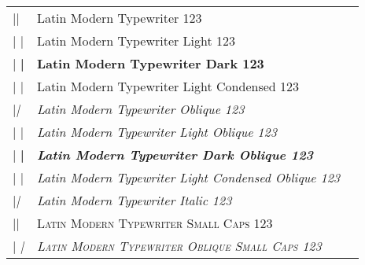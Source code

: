 \documentclass[a4paper]{article}
\makeatletter
\newenvironment{vrb}{\begin{tabular}{@{}p{5cm}ll@{}}}{\end{tabular}}
\makeatother
\begin{document}
\tmstyle
\begin{vrb}
|\ttfamily\tmstyle | & {Latin Modern Typewriter 123} \\
|  \lgweight | & {\lgweight Latin Modern Typewriter Light 123} \\
|  \bfseries | & {\bfseries Latin Modern Typewriter Dark 123} \\
|  \fontseries{lc}\selectfont | & {\fontseries{lc}\selectfont Latin Modern Typewriter Light Condensed 123} \\
|\slshape | & {\slshape Latin Modern Typewriter Oblique 123} \\
|  \lgweight | & {\lgweight\slshape Latin Modern Typewriter Light Oblique 123} \\
|  \bfseries | & {\bfseries\slshape Latin Modern Typewriter Dark Oblique 123} \\
|  \fontseries{lc} | & {\fontseries{lc}\slshape Latin Modern Typewriter Light Condensed Oblique 123} \\
|\itshape | & {\itshape Latin Modern Typewriter Italic 123} \\
|\scshape | & {\scshape Latin Modern Typewriter Small Caps 123} \\
|  \slshape | & {\scshape\slshape Latin Modern Typewriter Oblique Small Caps 123} \\
\end{vrb}
\end{document}
